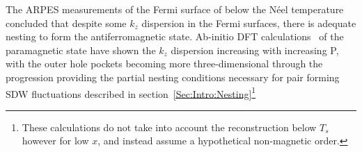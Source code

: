 The \ac{ARPES} measurements of the Fermi surface of \BaFeAs{} below the N\'eel temperature concluded that despite some $k_z$ dispersion in the Fermi surfaces, there is adequate nesting to form the antiferromagnetic state. Ab-initio DFT calculations~\cite{Shishido2010} of the paramagnetic state have shown the $k_z$ dispersion increasing with increasing P, with the outer hole pockets becoming more three-dimensional through the progression providing the partial nesting conditions necessary for pair forming \ac{SDW} fluctuations described in section~\ref{Sec:Intro:Nesting}\footnote{These calculations do not take into account the reconstruction below $T_s$ however for low $x$, and instead assume a hypothetical non-magnetic order.}



